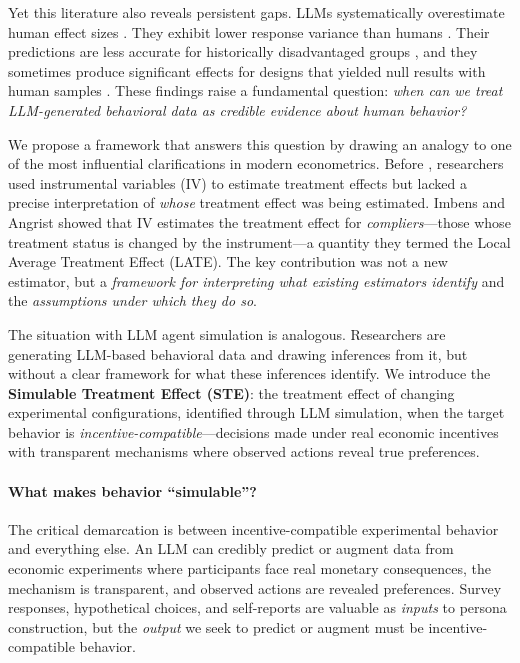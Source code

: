 \documentclass[12pt]{article}
\begin{document}
Yet this literature also reveals persistent gaps. LLMs systematically overestimate human effect sizes \citep{cui2025ai, hewitt2024predicting}. They exhibit lower response variance than humans \citep{bisbee2024synthetic}. Their predictions are less accurate for historically disadvantaged groups \citep{dominguez2024questioning}, and they sometimes produce significant effects for designs that yielded null results with human samples \citep{cui2025ai}. These findings raise a fundamental question: \textit{when can we treat LLM-generated behavioral data as credible evidence about human behavior?}

We propose a framework that answers this question by drawing an analogy to one of the most influential clarifications in modern econometrics. Before \citet{imbens1994identification}, researchers used instrumental variables (IV) to estimate treatment effects but lacked a precise interpretation of \textit{whose} treatment effect was being estimated. Imbens and Angrist showed that IV estimates the treatment effect for \textit{compliers}---those whose treatment status is changed by the instrument---a quantity they termed the Local Average Treatment Effect (LATE). The key contribution was not a new estimator, but a \textit{framework for interpreting what existing estimators identify} and the \textit{assumptions under which they do so}.

The situation with LLM agent simulation is analogous. Researchers are generating LLM-based behavioral data and drawing inferences from it, but without a clear framework for what these inferences identify. We introduce the \textbf{Simulable Treatment Effect (STE)}: the treatment effect of changing experimental configurations, identified through LLM simulation, when the target behavior is \textit{incentive-compatible}---decisions made under real economic incentives with transparent mechanisms where observed actions reveal true preferences.

\paragraph{What makes behavior ``simulable''?}
The critical demarcation is between incentive-compatible experimental behavior and everything else. An LLM can credibly predict or augment data from economic experiments where participants face real monetary consequences, the mechanism is transparent, and observed actions are revealed preferences. Survey responses, hypothetical choices, and self-reports are valuable as \textit{inputs} to persona construction, but the \textit{output} we seek to predict or augment must be incentive-compatible behavior.
\end{document}
